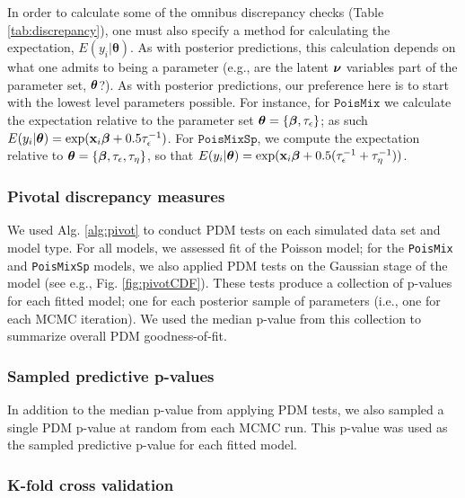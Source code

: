 \documentclass[12pt,english]{article}
\begin{document}
\begin{spacing}{1.9}
In order to calculate some of the omnibus discrepancy checks (Table \ref{tab:discrepancy}), one must also specify a method for calculating the expectation, $E(y_i|\boldsymbol{\theta})$.  As with posterior predictions, this calculation depends on what one admits to being a parameter (e.g., are the latent $\boldsymbol{\nu}$ variables part of the parameter set, $\boldsymbol{\theta}$?).  As with posterior predictions, our preference here is to start with the lowest level parameters possible.  For instance, for $\texttt{PoisMix}$ we calculate the expectation relative to the parameter set $\boldsymbol{\theta} = \{ \boldsymbol{\beta}, \tau_\epsilon \}$; as such $E(y_i|\boldsymbol{\theta}) = \exp({\bf x}_i \boldsymbol{\beta} + 0.5 \tau_\epsilon^{-1})$.  For $\texttt{PoisMixSp}$, we compute the expectation relative to $\boldsymbol{\theta} = \{ \boldsymbol{\beta}, \tau_\epsilon, \tau_\eta \}$, so that $E(y_i|\boldsymbol{\theta}) = \exp({\bf x}_i \boldsymbol{\beta} + 0.5 (\tau_\epsilon^{-1} + \tau_\eta^{-1}))$.

\subsubsection{Pivotal discrepancy measures}

We used Alg. \ref{alg:pivot} to conduct PDM tests on each simulated data set and model type.  For all models, we assessed fit of the Poisson model; for the \texttt{PoisMix} and \texttt{PoisMixSp} models, we also applied PDM tests on the Gaussian stage of the model (see e.g., Fig. \ref{fig:pivotCDF}).  These tests produce a collection of p-values for each fitted model; one for each posterior sample of parameters (i.e., one for each MCMC iteration).  We used the median p-value from this collection to summarize overall PDM goodness-of-fit.

\subsubsection{Sampled predictive p-values}

In addition to the median p-value from applying PDM tests, we also sampled a single PDM p-value at random from each MCMC run.  This p-value was used as the sampled predictive p-value for each fitted model.

\subsubsection{K-fold cross validation}


\end{spacing}
\end{document}
